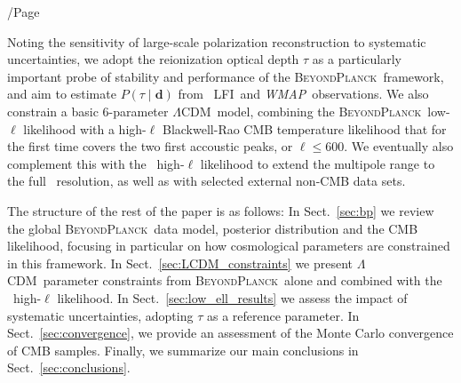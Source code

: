 /Page\documentclass[twocolumn]{aa}
\def\WMAP{\textit{WMAP}}
\def\LCDM{$\Lambda$CDM}
\newcommand{\BP}{\textsc{BeyondPlanck}}
\newcommand{\lfi}[0]{LFI}
\begin{document}
Noting the sensitivity of large-scale polarization reconstruction 
to systematic uncertainties, we adopt the reionization optical depth $\tau$ as a
particularly important probe of stability and performance of the
\BP\ framework, and aim to estimate $P(\tau\mid\mathbf{d})$ from
\Planck\ \lfi\ and \WMAP\ observations. We also constrain a basic
$6$-parameter \LCDM\ model, combining the \BP\ low-$\ell$ likelihood
with a high-$\ell$ Blackwell-Rao CMB temperature likelihood that for
the first time covers the two first accoustic peaks, or
$\ell\le600$. We eventually also complement this with the
\Planck\ high-$\ell$ likelihood to extend the multipole range to the
full \Planck\ resolution, as well as with selected external non-CMB data
sets.

The structure of the rest of the paper is as follows: In
Sect.~\ref{sec:bp} we review the global \BP\ data model, posterior
distribution and the CMB likelihood, focusing in particular on how
cosmological parameters are constrained in this framework. In
Sect.~\ref{sec:LCDM_constraints} we present \LCDM\ parameter
constraints from \BP\ alone and combined with the \Planck\ high-$\ell$
likelihood. In Sect.~\ref{sec:low_ell_results} we assess the impact
of systematic uncertainties, adopting $\tau$ as a reference
parameter. In Sect.~\ref{sec:convergence}, we provide an assessment of
the Monte Carlo convergence of CMB samples. Finally, we summarize our
main conclusions in Sect.~\ref{sec:conclusions}.
\end{document}

